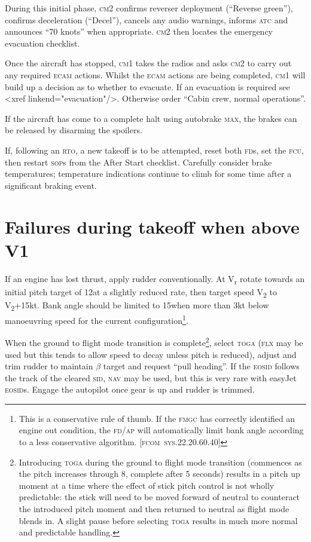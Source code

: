 \documentclass[a5paper,11pt,twoside]{book}
\newcommand{\inlcite}[1]{{\footnotesize\scshape\MakeLowercase{[#1]}}}
\newcommand{\multicite}[1]{%

  \nopagebreak
  \noindent{{\color{blue}\inlcite{#1}}}
}
\newcommand{\V}[1]{V\textsubscript{#1}}
\newcommand{\ac}[1]{{\scshape\MakeLowercase{#1}}}
\begin{document}
During this initial phase, \ac{CM2} confirms reverser deployment (``Reverse
green''), confirms deceleration (``Decel''), cancels any audio warnings, informs
\ac{ATC} and announces ``70 knots'' when appropriate. \ac{CM2} then locates the
emergency evacuation checklist.

Once the aircraft has stopped, \ac{CM1} takes the radios and asks \ac{CM2} to
carry out any required \ac{ECAM} actions. Whilst the \ac{ECAM} actions are being
completed, \ac{CM1} will build up a decision as to whether to evacuate. If an
evacuation is required see <xref linkend="evacuation"/>. Otherwise order ``Cabin
crew, normal operations''.

If the aircraft has come to a complete halt using autobrake \ac{MAX}, the brakes
can be released by disarming the spoilers.

If, following an \ac{RTO}, a new takeoff is to be attempted, reset both
\ac{FD}s, set the \ac{FCU}, then restart \ac{SOP}s from the After Start
checklist. Carefully consider brake temperatures; temperature indications
continue to climb for some time after a significant braking event.

\multicite{EOMB~3.10, FCTM~PRO.AEP.MISC}


\section{Failures during takeoff when above V1}

If an engine has lost thrust, apply rudder conventionally. At V\textsubscript{r}
rotate towards an initial pitch target of 12\textonehalf\textdegree{ }at a
slightly reduced rate, then target speed \V{2} to \V{2}+15kt. Bank angle should
be limited to 15\textdegree{ }when more than 3kt below manoeuvring speed for the
current configuration\footnote{This is a conservative rule of thumb. If the
\ac{FMGC} has correctly identified an engine out condition, the \ac{FD/AP} will
automatically limit bank angle according to a less conservative
algorithm. \inlcite{FCOM~SYS.22.20.60.40}}.

When the ground to flight mode transition is complete\footnote{Introducing
\ac{TOGA} during the ground to flight mode transition (commences as the pitch
increases through 8\textdegree{ }, complete after 5 seconds) results in a pitch
up moment at a time where the effect of stick pitch control is not wholly
predictable: the stick will need to be moved forward of neutral to counteract
the introduced pitch moment and then returned to neutral as flight mode blends
in. A slight pause before selecting \ac{TOGA} results in much more normal and
predictable handling.}, select \ac{TOGA} (\ac{FLX} may be used but this tends to
allow speed to decay unless pitch is reduced), adjust and trim rudder to
maintain $\beta$ target and request ``pull heading''. If the \ac{EOSID} follows
the track of the cleared \ac{SID}, \ac{NAV} may be used, but this is very rare
with easyJet \ac{EOSID}s.  Engage the autopilot once gear is up and rudder is
trimmed.
\end{document}
